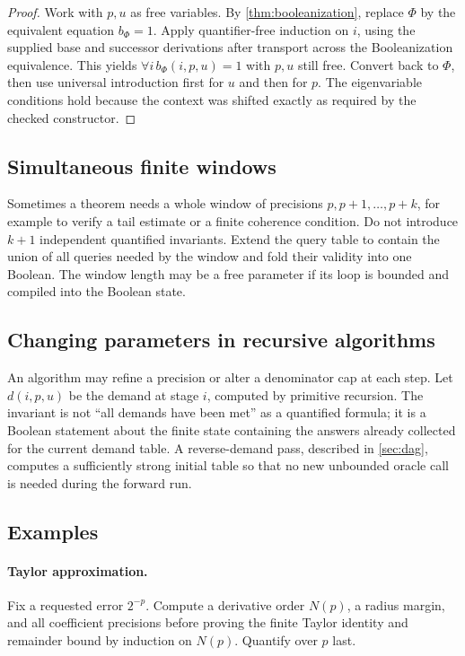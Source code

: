 \begin{proof}
Work with \(p,u\) as free variables.  By \cref{thm:booleanization}, replace
\(\Phi\) by the equivalent equation \(b_\Phi=1\).  Apply quantifier-free
induction on \(i\), using the supplied base and successor derivations after
transport across the Booleanization equivalence.  This yields
\(\forall i\,b_\Phi(i,p,u)=1\) with \(p,u\) still free.  Convert back to
\(\Phi\), then use universal introduction first for \(u\) and then for \(p\).
The eigenvariable conditions hold because the context was shifted exactly as
required by the checked  constructor.
\end{proof}

\subsection{Simultaneous finite windows}

Sometimes a theorem needs a whole window of precisions
\(p,p+1,\ldots,p+k\), for example to verify a tail estimate or a finite
coherence condition.  Do not introduce \(k+1\) independent quantified
invariants.  Extend the query table to contain the union of all queries needed
by the window and fold their validity into one Boolean.  The window length may
be a free parameter if its loop is bounded and compiled into the Boolean
state.

\subsection{Changing parameters in recursive algorithms}

An algorithm may refine a precision or alter a denominator cap at each step.
Let \(d(i,p,u)\) be the demand at stage \(i\), computed by primitive recursion.
The invariant is not ``all demands have been met'' as a quantified formula; it
is a Boolean statement about the finite state containing the answers already
collected for the current demand table.  A reverse-demand pass, described in
\cref{sec:dag}, computes a sufficiently strong initial table so that no new
unbounded oracle call is needed during the forward run.

\subsection{Examples}

\paragraph{Taylor approximation.}
Fix a requested error \(2^{-p}\).  Compute a derivative order \(N(p)\), a
radius margin, and all coefficient precisions before proving the finite Taylor
identity and remainder bound by induction on \(N(p)\).  Quantify over \(p\)
last.

